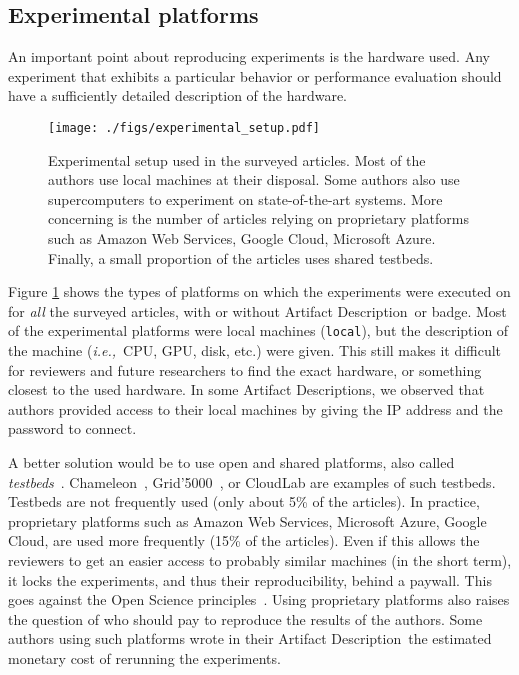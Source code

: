 \documentclass[sigconf,natbib=false]{acmart}
\newcommand{\ie}{\emph{i.e.,}}
\newcommand{\ad}{Artifact Description}
\begin{document}
\subsection{Experimental platforms}\label{sec:sop:expe}

An important point about reproducing experiments is the hardware used.
Any experiment that exhibits a particular behavior or performance evaluation should have a sufficiently detailed description of the hardware. 

\begin{figure}
  \centering
  \texttt{[image: ./figs/experimental\_setup.pdf]}
  \caption{Experimental setup used in the surveyed articles.
  Most of the authors use local machines at their disposal.
  Some authors also use supercomputers to experiment on state-of-the-art systems.
  More concerning is the number of articles relying on proprietary platforms such as Amazon Web Services, Google Cloud, Microsoft Azure.
  Finally, a small proportion of the articles uses shared testbeds.}\label{fig:experimental_setup}
\end{figure}

Figure \ref{fig:experimental_setup} shows the types of platforms on which the experiments were executed on for \emph{all} the surveyed articles, with or without \ad\ or badge.
Most of the experimental platforms were local machines (\texttt{local}), but the description of the machine (\ie\ CPU, GPU, disk, etc.) were given.
This still makes it difficult for reviewers and future researchers to find the exact hardware, or something closest to the used hardware.
In some \ad s, we observed that authors provided access to their local machines by giving the IP address and the password to connect.

A better solution would be to use open and shared platforms, also called \emph{testbeds}\ \cite{nussbaum2017testbeds}.
Chameleon\ \cite{chameleon}, Grid'5000\ \cite{grid5000}, or CloudLab \cite{cloudlab} are examples of such testbeds.
Testbeds are not frequently used (only about 5\% of the articles).
In practice, proprietary platforms such as Amazon Web Services, Microsoft Azure, Google Cloud, are used more frequently (15\% of the articles).
Even if this allows the reviewers to get an easier access to probably similar machines (in the short term), it locks the experiments, and thus their reproducibility, behind a paywall.
This goes against the Open Science principles\ \cite{openscience_unesco}.
Using proprietary platforms also raises the question of who should pay to reproduce the results of the authors.
Some authors using such platforms wrote in their \ad\ the estimated monetary cost of rerunning the experiments.
\end{document}
